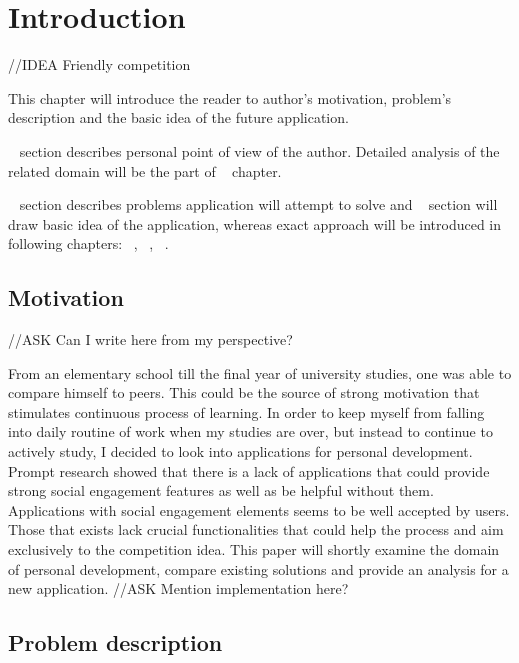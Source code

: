 
\chapter{Introduction}\label{ch:introduction}

{\color{red}//IDEA Friendly competition}

This chapter will introduce the reader to author's motivation, problem's description and the basic idea of the future application.

~ section describes personal point of view of the author.
Detailed analysis of the related domain will be the part of ~ chapter.

~ section describes problems application will attempt to solve and
~ section will draw basic idea of the application, whereas exact approach
will be introduced in following chapters: ~, ~, ~.


\section{Motivation}\label{sec:introduction-motivation}

{\color{gray}//ASK Can I write here from my perspective?}

From an elementary school till the final year of university studies, one was able to compare himself to peers.
This could be the source of strong motivation that stimulates continuous process of learning.
In order to keep myself from falling into daily routine of work when my studies are over,
but instead to continue to actively study, I decided to look into applications for personal development.
Prompt research showed that there is a lack of applications that could provide strong social engagement features
as well as be helpful without them.
Applications with social engagement elements seems to be well accepted by users.
Those that exists lack crucial functionalities that could help the process and aim exclusively to the competition idea.
This paper will shortly examine the domain of personal development, compare existing solutions and provide an analysis for a
new application.
{\color{gray}//ASK Mention implementation here?}

\section{Problem description}\label{sec:problem-description}

